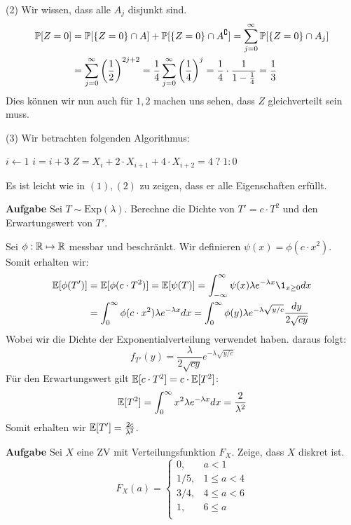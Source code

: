 (2) Wir wissen, dass alle $A_j$ disjunkt sind.
\begin{align*}
	\mathbb{P}[Z=0] &= \mathbb{P}[\{Z=0\} \cap A] + \mathbb{P}[\{Z=0\} \cap A^\complement] = \sum\limits_{j=0}^\infty \mathbb{P}[\{Z=0\} \cap A_j] \\
	&= \sum\limits_{j=0}^\infty \left(\frac{1}{2}\right)^{2j + 2} = \frac{1}{4}\sum\limits_{j=0}^\infty \left(\frac{1}{4}\right)^{j} = \frac{1}{4} \cdot \frac{1}{1 - \frac{1}{4}} = \frac{1}{3}
\end{align*}
Dies können wir nun auch für $1,2$ machen uns sehen, dass $Z$ gleichverteilt sein muss.

(3) Wir betrachten folgenden Algorithmus:
\begin{algorithmic}
	\State $i \gets 1$
		\State $i = i + 3$
	\EndWhile
	\State \Return $Z = X_i + 2 \cdot X_{i+1} + 4 \cdot X_{i+2} = 4 \; ? \; 1 : 0$
\end{algorithmic}
Es ist leicht wie in $(1), (2)$ zu zeigen, dass er alle Eigenschaften erfüllt.

\hrulefill

\textbf{Aufgabe}
Sei $T \sim \text{Exp}(\lambda)$. Berechne die Dichte von $T' = c \cdot T^2$ und den Erwartungswert von $T'$. \medskip

Sei $\phi: \mathbb{R} \mapsto \mathbb{R}$ messbar und beschränkt. Wir definieren $\psi(x) = \phi(c \cdot x^2)$. Somit erhalten wir:
\begin{align*}
	\E[\phi(T')] &= \E[\phi(c \cdot T^2)] = \E[\psi(T)] = \int_{-\infty}^\infty \psi(x) \lambda e^{-\lambda x}\1_{x \geq 0}dx \\
	&= \int_0^\infty \phi(c \cdot x^2) \lambda e^{-\lambda x}dx = \int_0^\infty \phi(y) \lambda e^{-\lambda \sqrt{y / c}} \frac{dy}{2 \sqrt{cy}} \\
\end{align*}
Wobei wir die Dichte der Exponentialverteilung verwendet haben. daraus folgt:
$$f_{T'}(y) = \frac{\lambda}{2 \sqrt{cy}} e^{-\lambda \sqrt{y / c}}$$
Für den Erwartungswert gilt $\mathbb{E}[c \cdot T^2] = c \cdot \mathbb{E}[T^2]$:
$$\mathbb{E}[T^2] = \int_{0}^\infty x^2 \lambda e^{-\lambda x}dx = \frac{2}{\lambda^2}$$
Somit erhalten wir $\mathbb{E}[T'] = \frac{2c}{\lambda^2}$.

\hrulefill

\textbf{Aufgabe}
Sei $X$ eine ZV mit Verteilungsfunktion $F_X$. Zeige, dass $X$ diskret ist.
$$ F_X(a) = \begin{cases}
	0, 		& a < 1 \\
	1/5, 	& 1 \leq a < 4 \\
	3/4, 	& 4 \leq a < 6 \\
	1, 		& 6 \leq a \\
\end{cases}$$ \medskip

